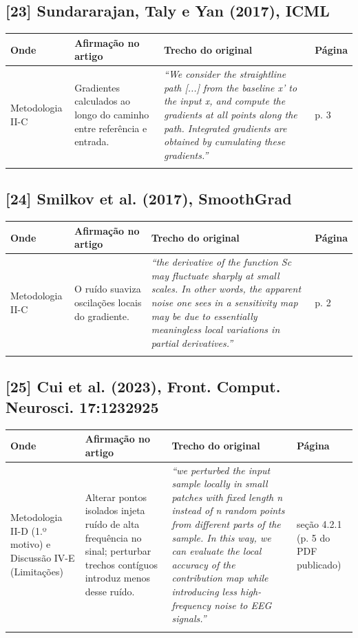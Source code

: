 \documentclass[11pt,a4paper]{article}
\begin{document}
\subsection*{[23] Sundararajan, Taly e Yan (2017), ICML}
\begin{longtable}{>{\raggedright\arraybackslash}p{2.6cm}>{\raggedright\arraybackslash}p{4.6cm}>{\raggedright\arraybackslash}p{7.6cm}>{\raggedright\arraybackslash}p{1.4cm}}
\toprule
\textbf{Onde} & \textbf{Afirmação no artigo} & \textbf{Trecho do original} & \textbf{Página} \\
\midrule
Metodologia II-C & Gradientes calculados ao longo do caminho entre referência e entrada. & \textit{``We consider the straightline path [...] from the baseline x' to the input x, and compute the gradients at all points along the path. Integrated gradients are obtained by cumulating these gradients.''} & p. 3 \\
\addlinespace
\bottomrule
\end{longtable}
\subsection*{[24] Smilkov et al. (2017), SmoothGrad}
\begin{longtable}{>{\raggedright\arraybackslash}p{2.6cm}>{\raggedright\arraybackslash}p{4.6cm}>{\raggedright\arraybackslash}p{7.6cm}>{\raggedright\arraybackslash}p{1.4cm}}
\toprule
\textbf{Onde} & \textbf{Afirmação no artigo} & \textbf{Trecho do original} & \textbf{Página} \\
\midrule
Metodologia II-C & O ruído suaviza oscilações locais do gradiente. & \textit{``the derivative of the function Sc may fluctuate sharply at small scales. In other words, the apparent noise one sees in a sensitivity map may be due to essentially meaningless local variations in partial derivatives.''} & p. 2 \\
\addlinespace
\bottomrule
\end{longtable}
\subsection*{[25] Cui et al. (2023), Front. Comput. Neurosci. 17:1232925}
\begin{longtable}{>{\raggedright\arraybackslash}p{2.6cm}>{\raggedright\arraybackslash}p{4.6cm}>{\raggedright\arraybackslash}p{7.6cm}>{\raggedright\arraybackslash}p{1.4cm}}
\toprule
\textbf{Onde} & \textbf{Afirmação no artigo} & \textbf{Trecho do original} & \textbf{Página} \\
\midrule
Metodologia II-D (1.º motivo) e Discussão IV-E (Limitações) & Alterar pontos isolados injeta ruído de alta frequência no sinal; perturbar trechos contíguos introduz menos desse ruído. & \textit{``we perturbed the input sample locally in small patches with fixed length n instead of n random points from different parts of the sample. In this way, we can evaluate the local accuracy of the contribution map while introducing less high-frequency noise to EEG signals.''} & seção 4.2.1 (p. 5 do PDF publicado) \\
\addlinespace
\bottomrule
\end{longtable}
\end{document}

